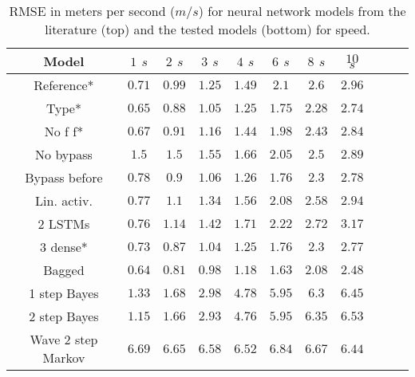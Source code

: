 \documentclass[preprint,12pt]{elsarticle}
\begin{document}
\begin{table}[!ht]
	\centering
    \begin{tabular}{|c|c|c|c|c|c|c|c|c|c|c|}
        \hline
        Model & $1$ $s$ & $2$ $s$ & $3$ $s$ & $4$ $s$ & $6$ $s$ & $8$ $s$ & $10$ $s$ \\ \hline
        Reference* & $0.71$ & $0.99$ & $1.25$ & $1.49$ & $2.1$ & $2.6$ & $2.96$ \\ \hline
        Type* & $0.65$ & $0.88$ & $1.05$ & $1.25$ & $1.75$ & $2.28$ & $2.74$ \\ \hline
        No f f* & $0.67$ & $0.91$ & $1.16$ & $1.44$ & $1.98$ & $2.43$ & $2.84$ \\ \hline
        No bypass & $1.5$ & $1.5$ & $1.55$ & $1.66$ & $2.05$ & $2.5$ & $2.89$ \\ \hline
        Bypass before & $0.78$ & $0.9$ & $1.06$ & $1.26$ & $1.76$ & $2.3$ & $2.78$ \\ \hline
        Lin. activ. & $0.77$ & $1.1$ & $1.34$ & $1.56$ & $2.08$ & $2.58$ & $2.94$ \\ \hline
        2 LSTMs & $0.76$ & $1.14$ & $1.42$ & $1.71$ & $2.22$ & $2.72$ & $3.17$ \\ \hline
        3 dense* & $0.73$ & $0.87$ & $1.04$ & $1.25$ & $1.76$ & $2.3$ & $2.77$ \\ \hline
        Bagged & $\mathbf{0.64}$ & $\mathbf{0.81}$ & $\mathbf{0.98}$ & $\mathbf{1.18}$ & $\mathbf{1.63}$ & $\mathbf{2.08}$ & $\mathbf{2.48}$ \\ \hline 
        1 step Bayes & $1.33$ & $1.68$ & $2.98$ & $4.78$ & $5.95$ & $6.3$ & $6.45$ \\ \hline
        2 step Bayes & $1.15$ & $1.66$ & $2.93$ & $4.76$ & $5.95$ & $6.35$ & $6.53$ \\ \hline
        Wave 2 step Markov & $6.69$ & $6.65$ & $6.58$ & $6.52$ & $6.84$ & $6.67$ & $6.44$ \\ \hline
    \end{tabular}
    \caption{RMSE in meters per second ($m/s$) for neural network models from the literature \cite{altche2017lstm} (top) and the tested models (bottom) for speed.}
    \label{tab:longitudinal_speed}
\end{table}
\end{document}
